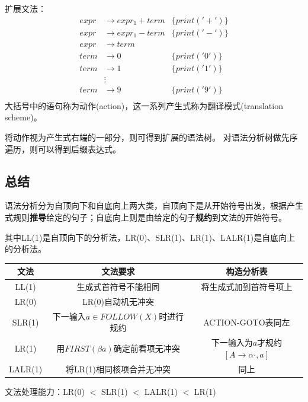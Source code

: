 扩展文法：
\[\begin{array}{rll}
expr &\to expr_1 + term & \{print('+')\}\\
expr &\to expr_1 - term & \{print('-')\}\\
expr &\to term & \\
term &\to 0    & \{print('0')\}\\
term &\to 1    & \{print('1')\}\\
     &\vdots   & \\
term &\to 9    & \{print('9')\}\\
\end{array}\]
大括号中的语句称为动作(action)，这一系列产生式称为翻译模式(translation scheme)。

将动作视为产生式右端的一部分，则可得到扩展的语法树。
对语法分析树做先序遍历，则可以得到后缀表达式。

\subsection{总结}
语法分析分为自顶向下和自底向上两大类，自顶向下是从开始符号出发，根据产生式规则\textbf{推导}给定的句子；自底向上则是由给定的句子\textbf{规约}到文法的开始符号。

其中LL(1)是自顶向下的分析法，LR(0)、SLR(1)、LR(1)、LALR(1)是自底向上的分析法。
\begin{center}
\begin{tabular}{|c|c|c|}\hline
文法 & 文法要求 & 构造分析表 \\\hline
LL(1) & 生成式首符号不能相同 & 将生成式加到首符号项上\\\hline
LR(0) & LR(0)自动机无冲突 & \\\hline
SLR(1) & 下一输入$a\in FOLLOW(X)$时进行规约 & ACTION-GOTO表同左\\\hline
LR(1) & 用$FIRST(\beta a)$确定前看项无冲突 & 下一输入为$a$才规约$[A\to\alpha\cdot,a]$\\\hline
LALR(1) & 将LR(1)相同核项合并无冲突 & 同上\\\hline
\end{tabular}
\end{center}


文法处理能力：LR(0) $<$ SLR(1) $<$ LALR(1) $<$ LR(1)